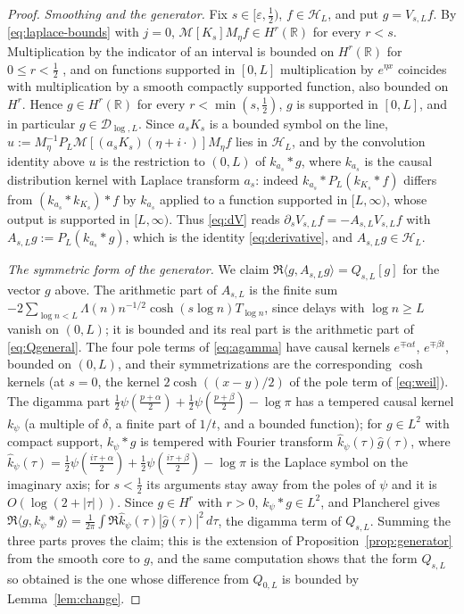 \documentclass[11pt]{article}
\numberwithin{equation}{section}
\theoremstyle{definition}
\theoremstyle{remark}
\newcommand{\HH}{\mathcal H}
\newcommand{\DD}{\mathcal D}
\newcommand{\RR}{\mathbb R}
\newcommand{\ip}[2]{\langle#1,#2\rangle}
\begin{document}
\begin{proof}
\emph{Smoothing and the generator.} Fix $s\in[\varepsilon,\tfrac12)$, $f\in\HH_L$,
and put $g=V_{s,L}f$. By \eqref{eq:laplace-bounds} with $j=0$,
$\mathcal M[K_s]M_\eta f\in H^r(\RR)$ for every $r<s$. Multiplication by the
indicator of an interval is bounded on $H^r(\RR)$ for $0\le r<\tfrac12$
\cite{Strichartz1967}, and on functions supported in $[0,L]$ multiplication by
$e^{\eta x}$ coincides with multiplication by a smooth compactly supported
function, also bounded on $H^r$. Hence $g\in H^r(\RR)$ for every
$r<\min(s,\tfrac12)$, $g$ is supported in $[0,L]$, and in particular
$g\in\DD_{\log,L}$. Since $a_sK_s$ is a bounded symbol on the line,
$u:=M_\eta^{-1}P_L\mathcal M[(a_sK_s)(\eta+i\cdot)]M_\eta f$ lies in $\HH_L$,
and by the convolution identity above $u$ is the restriction to $(0,L)$ of
$k_{a_s}*g$, where $k_{a_s}$ is the causal distribution kernel with Laplace
transform $a_s$: indeed $k_{a_s}*P_L(k_{K_s}*f)$ differs from
$(k_{a_s}*k_{K_s})*f$ by $k_{a_s}$ applied to a function supported in
$[L,\infty)$, whose output is supported in $[L,\infty)$. Thus
\eqref{eq:dV} reads $\partial_sV_{s,L}f=-A_{s,L}V_{s,L}f$ with
$A_{s,L}g:=P_L(k_{a_s}*g)$, which is the identity \eqref{eq:derivative}, and
$A_{s,L}g\in\HH_L$.

\emph{The symmetric form of the generator.} We claim
$\Re\ip g{A_{s,L}g}=Q_{s,L}[g]$ for the vector $g$ above. The arithmetic part
of $A_{s,L}$ is the finite sum
$-2\sum_{\log n<L}\Lambda(n)n^{-1/2}\cosh(s\log n)T_{\log n}$, since delays
with $\log n\ge L$ vanish on $(0,L)$; it is bounded and its real part is the
arithmetic part of \eqref{eq:Qgeneral}. The four pole terms of
\eqref{eq:agamma} have causal kernels $e^{\mp\alpha t}$, $e^{\mp\beta t}$,
bounded on $(0,L)$, and their symmetrizations are the corresponding
$\cosh$ kernels (at $s=0$, the kernel $2\cosh((x-y)/2)$ of the pole term of
\eqref{eq:weil}). The digamma part
$\tfrac12\psi(\tfrac{p+\alpha}2)+\tfrac12\psi(\tfrac{p+\beta}2)-\log\pi$ has a
tempered causal kernel $k_\psi$ (a multiple of $\delta$, a finite part of
$1/t$, and a bounded function); for $g\in L^2$ with compact support,
$k_\psi*g$ is tempered with Fourier transform $\hat k_\psi(\tau)\hat g(\tau)$,
where $\hat k_\psi(\tau)=\tfrac12\psi(\tfrac{i\tau+\alpha}2)+\tfrac12\psi(\tfrac{i\tau+\beta}2)-\log\pi$
is the Laplace symbol on the imaginary axis; for $s<\tfrac12$ its arguments
stay away from the poles of $\psi$ and it is $O(\log(2+|\tau|))$. Since
$g\in H^r$ with $r>0$, $k_\psi*g\in L^2$, and Plancherel gives
$\Re\ip g{k_\psi*g}=\frac1{2\pi}\int\Re\hat k_\psi(\tau)|\hat g(\tau)|^2\,d\tau$,
the digamma term of $Q_{s,L}$. Summing the three parts proves the claim; this
is the extension of Proposition~\ref{prop:generator} from the smooth core to
$g$, and the same computation shows that the form $Q_{s,L}$ so obtained is the
one whose difference from $Q_{0,L}$ is bounded by Lemma~\ref{lem:change}.


\end{proof}
\end{document}

